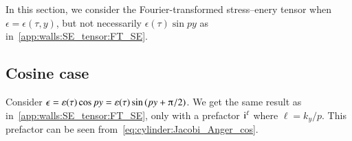 











In this section, we consider the Fourier-transformed stress--enery tensor when $\epsilon = \epsilon(\tau,y)$, but not necessarily $\epsilon(\tau)\sin{py}$ as in~\cref{app:walls:SE_tensor:FT_SE}.


\subsection{Cosine case}\label{app:walls:SE_tensor_alt:cos}
    Consider $\epsilon=\varepsilon(\tau)\cos{py} = \varepsilon(\tau)\sin{(py  + \ppi/2 )}$. We get the same result as in~\cref{app:walls:SE_tensor:FT_SE}, only with a prefactor $\mathrm{i}^{\ell}$ where $\ell = k_y/p$. This prefactor can be seen from~\cref{eq:cylinder:Jacobi_Anger_cos}.




